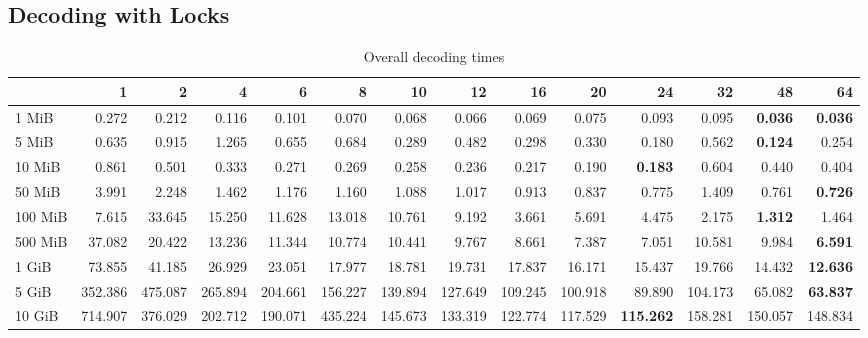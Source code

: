 \subsection{Decoding with Locks}
\begin{centering}
\begin{table}[!h]
	\caption{Overall decoding times}
	\begin{tabular}{lrrrrrrrrrrrrr}
		\toprule
		\diagbox[width=7em]{Sizes}{Threads}  & 1  &      2  &      4  &      6  &      8  &      10 &      12 &      16 &      20 &      24 &      32 &      48 &      64 \\
		\midrule
		1 MiB   &   0.272 &   0.212 &   0.116 &   0.101 &   0.070 &   0.068 &   0.066 &   0.069 &   0.075 &   0.093 &   0.095 &   \textbf{0.036} &   \textbf{0.036} \\
		5 MiB   &   0.635 &   0.915 &   1.265 &   0.655 &   0.684 &   0.289 &   0.482 &   0.298 &   0.330 &   0.180 &   0.562 &   \textbf{0.124} &   0.254 \\
		10 MiB  &   0.861 &   0.501 &   0.333 &   0.271 &   0.269 &   0.258 &   0.236 &   0.217 &   0.190 &   \textbf{0.183} &   0.604 &   0.440 &   0.404 \\
		50 MiB  &   3.991 &   2.248 &   1.462 &   1.176 &   1.160 &   1.088 &   1.017 &   0.913 &   0.837 &   0.775 &   1.409 &   0.761 &   \textbf{0.726} \\
		100 MiB &   7.615 &  33.645 &  15.250 &  11.628 &  13.018 &  10.761 &   9.192 &   3.661 &   5.691 &   4.475 &   2.175 &   \textbf{1.312} &   1.464 \\
		500 MiB &  37.082 &  20.422 &  13.236 &  11.344 &  10.774 &  10.441 &   9.767 &   8.661 &   7.387 &   7.051 &  10.581 &   9.984 &   \textbf{6.591} \\
		1 GiB   &  73.855 &  41.185 &  26.929 &  23.051 &  17.977 &  18.781 &  19.731 &  17.837 &  16.171 &  15.437 &  19.766 &  14.432 &  \textbf{12.636} \\
		5 GiB   & 352.386 & 475.087 & 265.894 & 204.661 & 156.227 & 139.894 & 127.649 & 109.245 & 100.918 &  89.890 & 104.173 &  65.082 &  \textbf{63.837} \\
		10 GiB  & 714.907 & 376.029 & 202.712 & 190.071 & 435.224 & 145.673 & 133.319 & 122.774 & 117.529 & \textbf{115.262} & 158.281 & 150.057 & 148.834 \\
		\bottomrule
	\end{tabular}
\end{table}


\end{centering}
